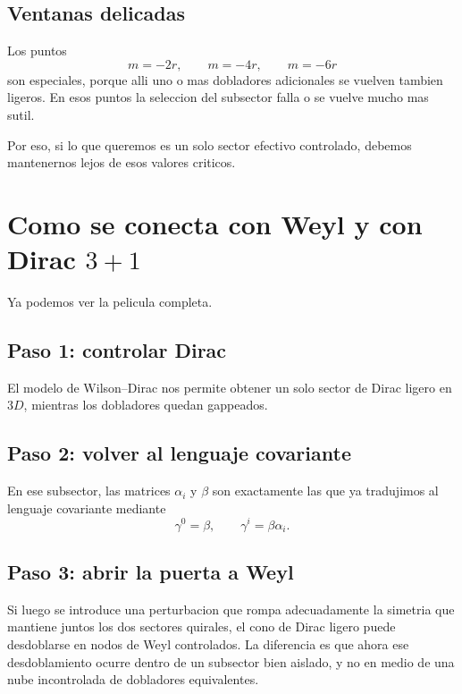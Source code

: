 \subsection{Ventanas delicadas}
Los puntos
\begin{equation}
m= -2r,\qquad m=-4r,\qquad m=-6r
\end{equation}
son especiales, porque alli uno o mas dobladores adicionales se vuelven tambien ligeros. En esos puntos la seleccion del subsector falla o se vuelve mucho mas sutil.

Por eso, si lo que queremos es un solo sector efectivo controlado, debemos mantenernos lejos de esos valores criticos.

\section{\texorpdfstring{Como se conecta con Weyl y con Dirac \(3+1\)}{Como se conecta con Weyl y con Dirac 3+1}}
Ya podemos ver la pelicula completa.

\subsection{Paso 1: controlar Dirac}
El modelo de Wilson--Dirac nos permite obtener un solo sector de Dirac ligero en \(3D\), mientras los dobladores quedan gappeados.

\subsection{Paso 2: volver al lenguaje covariante}
En ese subsector, las matrices \(\alpha_i\) y \(\beta\) son exactamente las que ya tradujimos al lenguaje covariante mediante
\begin{equation}
\gamma^0=\beta,
\qquad
\gamma^i=\beta\alpha_i.
\end{equation}

\subsection{Paso 3: abrir la puerta a Weyl}
Si luego se introduce una perturbacion que rompa adecuadamente la simetria que mantiene juntos los dos sectores quirales, el cono de Dirac ligero puede desdoblarse en nodos de Weyl controlados. La diferencia es que ahora ese desdoblamiento ocurre dentro de un subsector bien aislado, y no en medio de una nube incontrolada de dobladores equivalentes.

